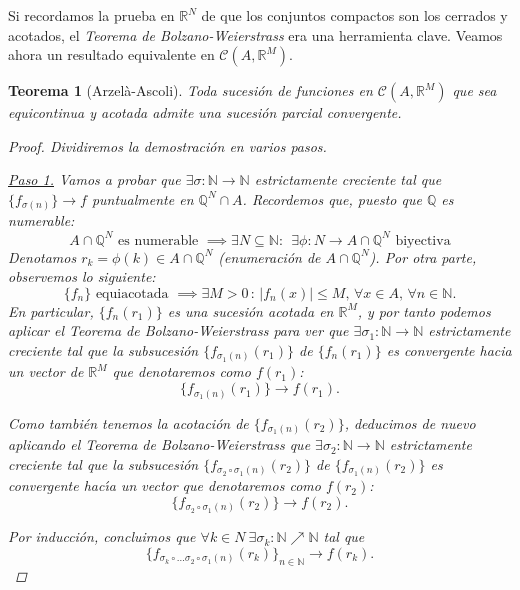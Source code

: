 \documentclass[11pt, a4paper]{article}
\newcommand{\N}{\mathbb{N}}
\theoremstyle{theorem-style}
\newtheorem{nth}{Teorema}[section]
\theoremstyle{definition-style}
\theoremstyle{remark-style}
\theoremstyle{example-style}
\begin{document}
Si recordamos la prueba en $\mathbb{R}^N$ de que los conjuntos compactos son los cerrados y acotados, el \textit{Teorema de Bolzano-Weierstrass} era una herramienta clave. Veamos ahora un resultado equivalente en $\mathcal{C}(A,\mathbb{R}^M)$.

\begin{nth}[Arzelà-Ascoli] \label{6} Toda sucesión de funciones en $\mathcal{C}(A,\mathbb{R}^M)$ que sea equicontinua y acotada admite una sucesión parcial convergente.

\begin{proof} Dividiremos la demostración en varios pasos.

\underline{Paso 1.} Vamos a probar que $\exists \sigma : \mathbb{N} \to \mathbb{N}$ estrictamente creciente tal que $\{f_{\sigma(n)}\} \to f$ puntualmente en $\mathbb{Q}^N\cap A$.
Recordemos que, puesto que $\mathbb Q$ es numerable:
\[
A\cap \mathbb Q^N \mbox{ es numerable } \implies \exists N\subseteq \N: \ \
\exists \phi :N \longrightarrow  A\cap \mathbb Q^N  \mbox{ biyectiva}
\]
Denotamos $r_k=\phi(k) \in  A\cap \mathbb Q^N $ (enumeraci\'on de $A\cap \mathbb Q^N $). Por otra parte, observemos lo siguiente:
\[
\{f_n \} \mbox{ equiacotada } \implies \exists M>0 \, : \, |f_n(x) |\leq M , \, \forall x\in A , \, \forall n\in \mathbb N.
\]
En particular, $\{ f_n (r_1)\}$ es una sucesi\'on acotada en $\mathbb R^M$, y por tanto podemos aplicar el \textit{Teorema de Bolzano-Weierstrass} para ver que $\exists \sigma_1:\mathbb N \longrightarrow \mathbb N$ estrictamente creciente tal que la subsucesión $\{ f_{\sigma_1 (n)} (r_1) \}$ de $\{ f_{n} (r_1) \}$ es convergente hacia un vector de  $\mathbb R^M$  que denotaremos como $f(r_1)$:
\[
\{ f_{\sigma_1 (n)} (r_1) \} \longrightarrow f(r_1).
\]

Como también tenemos la acotaci\'on de $\{ f_{\sigma_1 (n)} (r_2) \} $, deducimos de nuevo aplicando el \textit{Teorema de Bolzano-Weierstrass} que $\exists \sigma_2:\mathbb N \longrightarrow \mathbb N$ estrictamente creciente tal que la subsucesión $\{ f_{\sigma_2 \circ\sigma_1 (n)} (r_2) \}$ de $\{ f_{\sigma_1 (n)} (r_2) \}$ es convergente hac\'{\i}a un vector que denotaremos como $f(r_2)$:
\[
\{ f_{\sigma_2 \circ \sigma_1 (n)} (r_2) \} \longrightarrow f(r_2).
\]

Por inducci\'on, concluimos que
$
\forall k\in N \ \exists \sigma_k :\mathbb N \nearrow  \mathbb N   
$ tal que
\[
\{ f_{\sigma_k \circ \dots \sigma_2 \circ\sigma_1 (n)} (r_k) \}_{n\in\mathbb N}  \longrightarrow f(r_k).
\]


\end{proof}
\end{nth}
\end{document}
